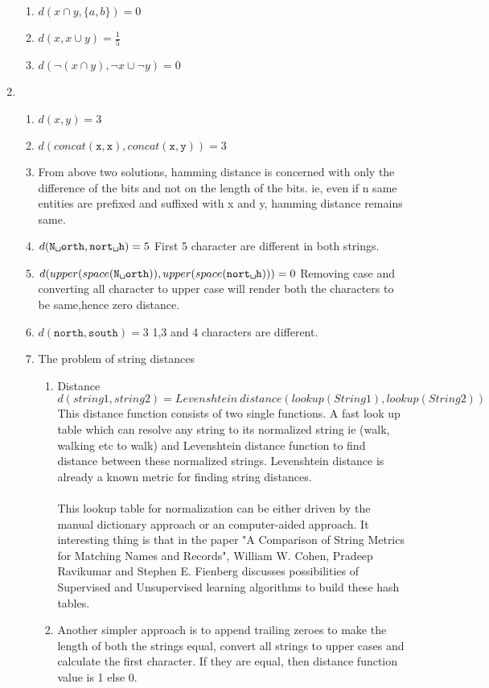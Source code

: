 \documentclass{article}
\begin{document}
\begin{enumerate}
\begin{enumerate}
\item $d(x\cap y, \{a, b\}) = 0$
\item $d(x, x \cup y) = \frac{1}{5}$
\item $d(\neg(x \cap y), \neg x \cup \neg y) = 0$
\end{enumerate}
\item
\begin{enumerate}
\item $d(x,y) = 3$
\item $d(concat(\texttt{x}, \texttt{x}), concat(\texttt{x},\texttt{y})) = 3$
\item From above two solutions, hamming distance is concerned with only the difference of the bits and not on the length of the bits. ie, even if n same entities are prefixed and suffixed with x and y, hamming distance remains same.
\item $d(\texttt{N\textvisiblespace orth}, \texttt{nort\textvisiblespace h}) = 5$ First 5 character are different in both strings.
\item $d(upper(space(\texttt{N\textvisiblespace orth})), upper(space(\texttt{nort\textvisiblespace h}))) = 0$ Removing case and converting all character to upper case will render both the characters to be same,hence zero distance.
\item $d(\texttt{north}, \texttt{south}) = 3$ 1,3 and 4 characters are different.
\item The problem of string distances
\begin{enumerate}
\item Distance $d(string1,string2)=Levenshtein \: distance (lookup(String1),lookup(String2))$\\
This distance function consists of two single functions. A fast look up table which can resolve any string to its normalized string ie (walk, walking etc to walk) and Levenshtein distance function to find distance between these normalized strings. Levenshtein distance is already a known metric for finding string distances. \\  \\ This lookup table for normalization can be either driven by the manual dictionary approach or an computer-aided approach. It interesting thing is that in the paper "A Comparison of String Metrics for Matching Names and Records", William W. Cohen, Pradeep Ravikumar and  Stephen E. Fienberg discusses possibilities of Supervised and Unsupervised learning algorithms to build these hash tables.
\item Another simpler approach is to append trailing zeroes to make the length of both the strings equal, convert all strings to upper cases and calculate the first character. If they are equal, then distance function value is 1 else 0.

\end{enumerate}
\end{enumerate}
\end{enumerate}
\end{document}
